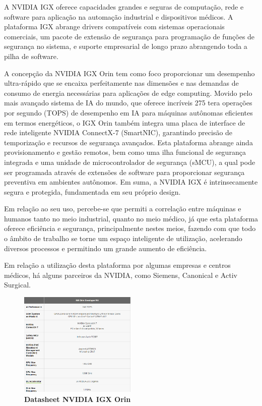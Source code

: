 \documentclass[conference]{IEEEtran}
\begin{document}
\par A NVIDIA IGX oferece capacidades grandes e seguras de computação, rede e software para aplicação na automação industrial e dispositivos médicos. A plataforma IGX abrange drivers compatíveis com sistemas operacionais comerciais, um pacote de extensão de segurança para programação de funções de segurança no sistema, e suporte empresarial de longo prazo abrangendo toda a pilha de software.

\par A concepção da NVIDIA IGX Orin tem como foco proporcionar um desempenho ultra-rápido que se encaixa perfeitamente nas dimensões e nas demandas de consumo de energia necessárias para aplicações de edge computing. Movido pelo mais avançado sistema de IA do mundo, que oferece incríveis 275 tera operações por segundo (TOPS) de desempenho em IA para máquinas autônomas eficientes em termos energéticos, o IGX Orin também integra uma placa de interface de rede inteligente NVIDIA ConnectX-7 (SmartNIC), garantindo precisão de temporização e recursos de segurança avançados.
Esta plataforma abrange ainda provisionamento e gestão remotos, bem como uma ilha funcional de segurança integrada e uma unidade de microcontrolador de segurança (sMCU), a qual pode ser programada através de extensões de software para proporcionar segurança preventiva em ambientes autônomos. Em suma, a NVIDIA IGX é intrinsecamente segura e protegida, fundamentada em seu próprio design.

\par Em relação ao seu uso, percebe-se que permiti a correlação entre máquinas e humanos tanto no meio industrial, quanto no meio médico, já que esta plataforma oferece eficiência e segurança, principalmente nestes meios, fazendo com que todo o âmbito de trabalho se torne um espaço inteligente de utilização, acelerando diversos processos e permitindo um grande aumento de eficiência.  

\par Em relação a utilização desta plataforma por algumas empresas e centros médicos, há alguns parceiros da NVIDIA, como Siemens, Canonical e Activ Surgical.


\begin{figure}[h]
\centerline{\includegraphics[width = 2.2in]{Screenshot 2023-08-20 000908.png}}
\caption{\textbf{Datasheet NVIDIA IGX Orin}}
\label{figAM9300}
\end{figure}
\end{document}
